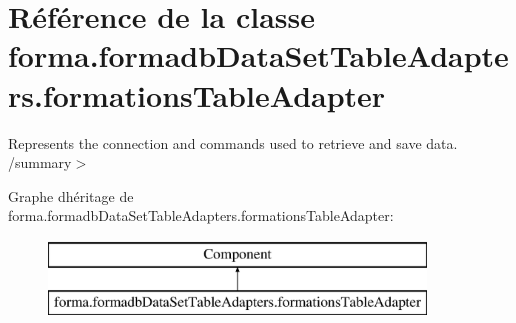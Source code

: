 \hypertarget{classforma_1_1formadb_data_set_table_adapters_1_1formations_table_adapter}{}\section{Référence de la classe forma.\+formadb\+Data\+Set\+Table\+Adapters.\+formations\+Table\+Adapter}
\label{classforma_1_1formadb_data_set_table_adapters_1_1formations_table_adapter}


Represents the connection and commands used to retrieve and save data. /summary$>$  


Graphe d\textquotesingle{}héritage de forma.\+formadb\+Data\+Set\+Table\+Adapters.\+formations\+Table\+Adapter\+:\begin{figure}[H]
\begin{center}
\leavevmode
\includegraphics[height=2.000000cm]{classforma_1_1formadb_data_set_table_adapters_1_1formations_table_adapter}
\end{center}
\end{figure}
